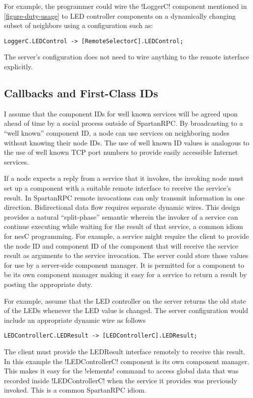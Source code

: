 For example, the programmer could wire the !LoggerC! component mentioned in
\autoref{figure-duty-usage} to LED controller components on a dynamically changing subset of
neighbors using a configuration such as:
\begin{lstlisting}
LoggerC.LEDControl -> [RemoteSelectorC].LEDControl;
\end{lstlisting}

The server's configuration does not need to wire anything to the remote interface explicitly.

\subsection{Callbacks and First-Class IDs}

I assume that the component IDs for well known services will be agreed upon ahead of time by a
social process outside of SpartanRPC. By broadcasting to a ``well known'' component ID, a node
can use services on neighboring nodes without knowing their node IDs. The use of well known ID
values is analogous to the use of well known TCP port numbers to provide easily accessible
Internet services.

If a node expects a reply from a service that it invokes, the invoking node must set up a
component with a suitable remote interface to receive the service's result. In SpartanRPC remote
invocations can only transmit information in one direction. Bidirectional data flow requires
separate dynamic wires. This design provides a natural ``split-phase'' semantic wherein the
invoker of a service can continue executing while waiting for the result of that service, a
common idiom for nesC programming. For example, a service might require the client to provide
the node ID and component ID of the component that will receive the service result as arguments
to the service invocation. The server could store those values for use by a server-side
component manager. It is permitted for a component to be its own component manager making it
easy for a service to return a result by posting the appropriate duty.

For example, assume that the LED controller on the server returns the old state of the LEDs
whenever the LED value is changed. The server configuration would include an appropriate
dynamic wire as follows
\begin{lstlisting}
LEDControllerC.LEDResult -> [LEDControllerC].LEDResult;
\end{lstlisting}

The client must provide the LEDResult interface remotely to receive this result. In this example
the !LEDControllerC! component is its own component manager. This makes it easy for the
!elements! command to access global data that was recorded inside !LEDControllerC! when the
service it provides was previously invoked. This is a common SpartanRPC idiom.

